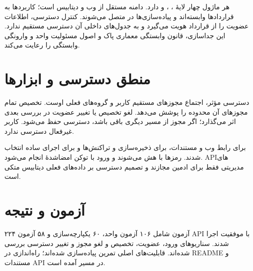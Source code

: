 \documentclass[12pt,a4paper]{article}
\begin{document}
هر ماژول چهار لایهٔ ، ،  و  دارد. دامنه مستقل از وب و دیتابیس است؛ کاربردها به قراردادها وابسته‌اند و پیاده‌سازی‌ها در  متصل می‌شوند. کنترل دسترسی، اطلاعات عضویت را از قرارداد هویت می‌گیرد و به جدول‌های داخلی آن دسترسی مستقیم ندارد. این جداسازی، قانون وابستگی معماری پاک و اصول مسئولیت واحد و وارونگی وابستگی را رعایت می‌کند.

\section{منطق دسترسی و ابزارها}
دسترسی مؤثر، اجتماع مجوزهای مستقیم کاربر و گروه‌های فعلی اوست. تخصیص  تمام مجوزهای آن محدوده را پوشش می‌دهد. لغو تخصیص یا تغییر عضویت در بررسی بعدی اثر می‌گذارد؛ اگر مجوز از مسیر دیگری باقی باشد، دسترسی حفظ می‌شود. کاربر غیرفعال دسترسی ندارد.

 برای رابط وب و مستندات،  برای ذخیره‌سازی و تراکنش‌ها و  برای اجرای ساده انتخاب شدند. رمزها با  هش می‌شوند و ورود با توکن امضاشدهٔ  انجام می‌شود. APIهای مدیریتی فقط برای ادمین مجازند و تصمیم دسترسی بر داده‌های فعلی دیتابیس متکی است.

\section{آزمون و نتیجه}
۲۲۴ آزمون شامل ۱۰۶ آزمون واحد، ۶۰ یکپارچه‌سازی و ۵۸ آزمون API با موفقیت اجرا شدند. سناریوهای ورود، عضویت، تخصیص و لغو مجوز و تغییر دسترسی بررسی شده‌اند. قابلیت‌های اصلی تمرین پیاده‌سازی شده‌اند؛ راه‌اندازی در README و مستندات API در مسیر  آمده است.
\end{document}
